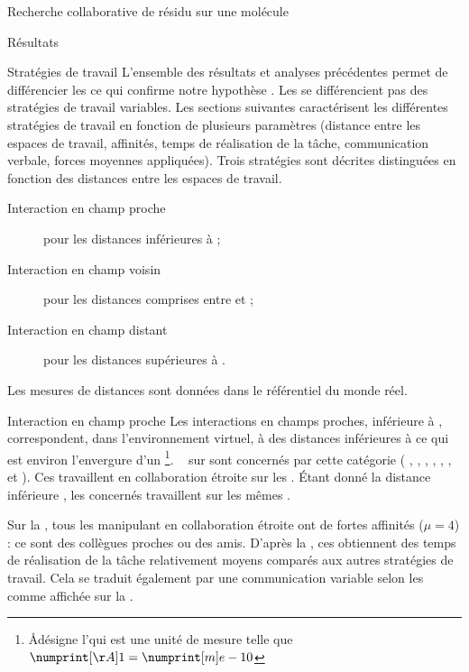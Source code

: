 \documentclass[myfrancais]{mythesis}
\begin{document}
\begin{mychapter}{Recherche collaborative de résidu sur une molécule}
\begin{mysection}{Résultats}
\begin{mysubsection}{Stratégies de travail}
				L'ensemble des résultats et analyses précédentes permet de différencier les  ce qui confirme notre hypothèse .
				Les  se différencient pas des stratégies de travail variables.
				Les sections suivantes caractérisent les différentes stratégies de travail en fonction de plusieurs paramètres (distance entre les espaces de travail, affinités, temps de réalisation de la tâche, communication verbale, forces moyennes appliquées).
				Trois stratégies sont décrites distinguées en fonction des distances entre les espaces de travail.
				\begin{description}
					\item[Interaction en champ proche] pour les distances inférieures à ;
					\item[Interaction en champ voisin] pour les distances comprises entre  et ;
					\item[Interaction en champ distant] pour les distances supérieures à .
				\end{description}
				Les mesures de distances sont données dans le référentiel du monde réel.
				\begin{mysubsubsection}{Interaction en champ proche}
					Les interactions en champs proches, inférieure à , correspondent, dans l'environnement virtuel, à des distances inférieures à  ce qui est environ l'envergure d'un \footnote{\og \AA \fg désigne l'\myangstrom qui est une unité de mesure telle que $\mynum[\AA]{1} = \mynum[m]{e-10}$}.
					~ sur  sont concernés par cette catégorie ( , , , , , ,  et ).
					Ces  travaillent en collaboration étroite sur les .
					Étant donné la distance inférieure , les  concernés travaillent sur les mêmes .

					Sur la , tous les  manipulant en collaboration étroite ont de fortes affinités ($\mu = 4$) : ce sont des collègues proches ou des amis.
					D'après la , ces  obtiennent des temps de réalisation de la tâche relativement moyens comparés aux autres stratégies de travail.
					Cela se traduit également par une communication variable selon les  comme affichée sur la .


\end{mysubsubsection}
\end{mysubsection}
\end{mysection}
\end{mychapter}
\end{document}
